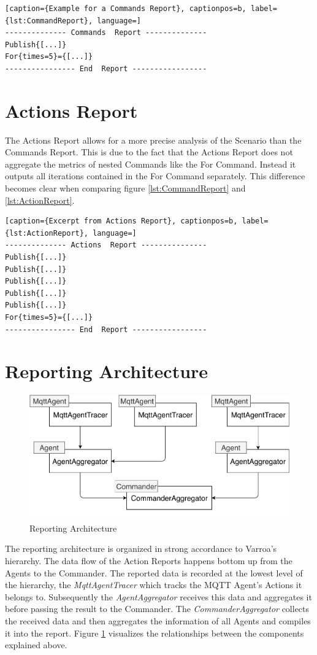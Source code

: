 \begin{lstlisting}[caption={Example for a Commands Report}, captionpos=b, label={lst:CommandReport}, language=]
-------------- Commands  Report --------------
Publish{[...]}
For{times=5}={[...]}
---------------- End  Report -----------------
\end{lstlisting}

\section{Actions Report}\label{sec:actionsReport}
The Actions Report allows for a more precise analysis of the Scenario than the Commands Report.
This is due to the fact that the Actions Report does not aggregate the metrics of nested Commands like the For Command.
Instead it outputs all iterations contained in the For Command separately.
This difference becomes clear when comparing figure \ref{lst:CommandReport} and \ref{lst:ActionReport}.
\begin{lstlisting}[caption={Excerpt from Actions Report}, captionpos=b, label={lst:ActionReport}, language=]
-------------- Actions  Report ---------------
Publish{[...]}
Publish{[...]}
Publish{[...]}
Publish{[...]}
Publish{[...]}
For{times=5}={[...]}
---------------- End  Report -----------------
\end{lstlisting}

\newpage
\section{Reporting Architecture}\label{sec:ReportingArchitecture}
\begin{figure}[H]
	\begin{center}
		\includegraphics[scale=0.75]{Resources/PDF/ReportingArchitecture}
		\caption{Reporting Architecture}
		\label{fig:ReportingArchitecture}
	\end{center}
\end{figure}
The reporting architecture is organized in strong accordance to Varroa's hierarchy.
The data flow of the Action Reports happens bottom up from the Agents to the Commander.
The reported data is recorded at the lowest level of the hierarchy, the \emph{MqttAgentTracer} which tracks the MQTT Agent's Actions it belongs to.
Subsequently the \emph{AgentAggregator} receives this data and aggregates it before passing the result to the Commander.
The \emph{CommanderAggregator} collects the received data and then aggregates the information of all Agents and compiles it into the report.
Figure \ref{fig:ReportingArchitecture} visualizes the relationships between the components explained above.

